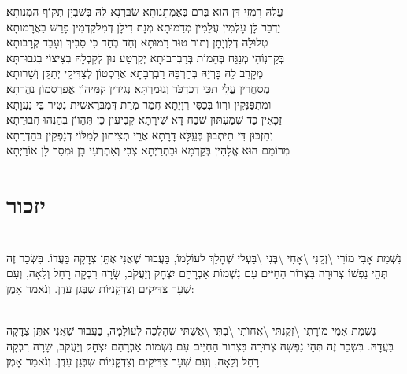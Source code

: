 \documentclass[twoside, openany, parskip=half, 11pt]{book}
\begin{document}
\begin{footnotesize}
\kahal
עֲלֵהּ רָמְזֵי דֵּן הוּא בְּרַם בְּאֶמְתָּנוּתָא שַׂבַּרְנָא לֵהּ בְּשִׁבְיָן תְּקוֹף הֵמְנוּתָא׃\\
\shatz
יַדְבַּר לָן עָלְמִין עֲלֵמִין מְדַמּוּתָא מְנָת דִּילָן דְּמִלְּקַדְמִין פָּרֵשׁ בַּאֲרָמוּתָא׃\\
\kahal
טְלוּלֵהּ דְלִוְיָתָן וְתוֹר טוּר רָמוּתָא וְחַד בְּחַד כִּי סָבִיךְ וְעָבֵד קְרָבוּתָא׃\\
\shatz
בְּקַרְנֽוֹהִי מְנַגַּח בְּהֵמוֹת בְּרַבְרְבוּתָא יְקַרְטַע נוּן לְקִבְלֵהּ בְּצִיצוֹי בִּגְבוּרְתָּא׃\\
\kahal
מְקָרֵב לֵהּ בָּרְיֵהּ בְּחַרְבֵּהּ רַבְרְבָתָא אֲרִסְטוֹן לְצַדִּיקֵי יְתַקֵּן וְשֵׁרוּתָא׃\\
\shatz
מְסַחֲרִין עֲלֵי תַכֵּי דְכַדְכֹּד וְגוּמַרְתָּא נְגִידִין קַמֵּיהוֹן אֲפַרְסְמוֹן נַהֲרָתָא׃\\
\kahal
וּמִתְפַּנְּקִין וּרְווֹ בְּכַסֵּי רְוָיָתָא חֲמַר מְרַת דְּמִבְּרֵאשִׁית נְטִיר בֵּי נַעֲוָתָא׃\\
\shatz
זַכָּאִין כַּד שְׁמַעְתּוּן שְׁבַח דָּא שִׁירָתָא קְבִיעִין כֵּן תֶּהֱווֹן בְּהַנְהוּ חֲבוּרָתָא׃\\
\kahal
וְתִזְכּוּן דִּי תֵיתְבוּן בְּעֵֽלָּא דָרָתָא אֲרֵי תְצִיתוּן לְמִלּוֹי דְנָפְקִין בְּהַדְרָתָא׃\\
\shatz
מְרוֹמָם הוּא אֱלָהִין בְּקַדְמָא וּבָתְרַיְתָא צְבִי וְאִתְרְעִי בָן וּמְסַר לָן אוֹרַיְתָא׃\\ 
\end{footnotesize}

\section[יזכור]{ יזכור }


\\
נִשְׁמַת אָבִי מוֹרִי \textbackslash זְקֵנִי \textbackslash אָחִי \textbackslash בְּנִי \textbackslash בַּעְלִי  שְׁהָלַךְ לְעוֹלָמוֹ, בַּעֲבוּר שֶׁאֲנִי אֶתֵּן צְדָקָה בַּעֲדוֹ. בִּשְׂכַר זֶה תְּהֵי נַפְשׁוֹ צְרוּרָה בִּצְרוֹר הַחַיִּים עִם נִשְׁמוֹת אַבְרָהַם יִצְחָק וְיַעֲקֹב, שָׂרָה רִבְקָה רָחֵל וְלֵאָה, וְעִם שְׁעָר צַדִּיקִים וְצַדְקָנִיּוֹת שְבְּגַן עֵדֶן. וְנֹאמַר אָמֶן:

\\
נִשְׁמַת אִמִּי מוֹרָתִי \textbackslash זְקֶנְתּי \textbackslash אֲחוׂתִי \textbackslash בִּתִּי \textbackslash אִשְׁתּי
שֶׁהָלְכָה לְעוֹלָמָהּ, בַּעֲבוּר שֶׁאֲנִי אֶתֵּן צְדָקָה בַּעֲדָהּ. בִּשְׂכַר זֶה תְּהֵי נַפְשָׁהּ צְרוּרָה בִּצְרוֹר הַחַיִּים עִם נִשְׁמוֹת אַבְרָהַם יִצְחָק וְיַעֲקֹב, שָׂרָה רִבְקָה רָחֵל וְלֵאָה, וְעִם שְׁעָר צַדִּיקִים וְצַדְקָנִיּוֹת שְבְּגַן עֵדֶן. וְנֹאמַר אָמֶן׃
\end{document}
